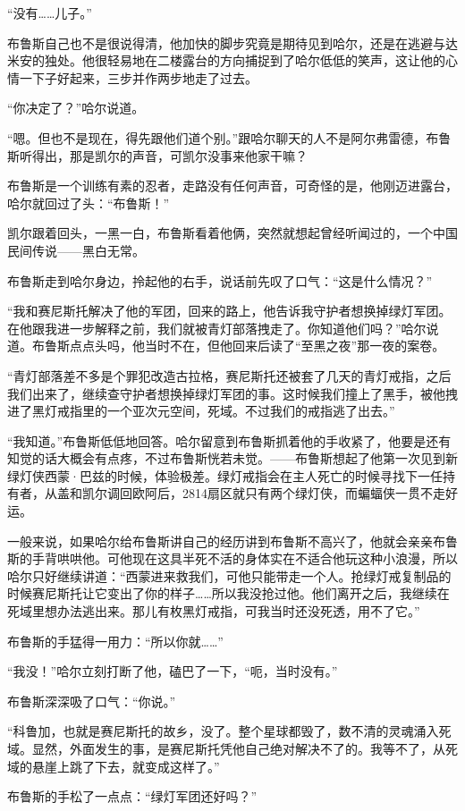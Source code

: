 \documentclass[../main]{subfiles}
\begin{document}
“没有……儿子。”

布鲁斯自己也不是很说得清，他加快的脚步究竟是期待见到哈尔，还是在逃避与达米安的独处。他很轻易地在二楼露台的方向捕捉到了哈尔低低的笑声，这让他的心情一下子好起来，三步并作两步地走了过去。

“你决定了？”哈尔说道。

“嗯。但也不是现在，得先跟他们道个别。”跟哈尔聊天的人不是阿尔弗雷德，布鲁斯听得出，那是凯尔的声音，可凯尔没事来他家干嘛？

布鲁斯是一个训练有素的忍者，走路没有任何声音，可奇怪的是，他刚迈进露台，哈尔就回过了头：“布鲁斯！”

凯尔跟着回头，一黑一白，布鲁斯看着他俩，突然就想起曾经听闻过的，一个中国民间传说——黑白无常。

布鲁斯走到哈尔身边，拎起他的右手，说话前先叹了口气：“这是什么情况？”

“我和赛尼斯托解决了他的军团，回来的路上，他告诉我守护者想换掉绿灯军团。在他跟我进一步解释之前，我们就被青灯部落拽走了。你知道他们吗？”哈尔说道。布鲁斯点点头吗，他当时不在，但他回来后读了“至黑之夜”那一夜的案卷。

“青灯部落差不多是个罪犯改造古拉格，赛尼斯托还被套了几天的青灯戒指，之后我们出来了，继续查守护者想换掉绿灯军团的事。这时候我们撞上了黑手，被他拽进了黑灯戒指里的一个亚次元空间，死域。不过我们的戒指逃了出去。”

“我知道。”布鲁斯低低地回答。哈尔留意到布鲁斯抓着他的手收紧了，他要是还有知觉的话大概会有点疼，不过布鲁斯恍若未觉。——布鲁斯想起了他第一次见到新绿灯侠西蒙·巴兹的时候，体验极差。绿灯戒指会在主人死亡的时候寻找下一任持有者，从盖和凯尔调回欧阿后，2814扇区就只有两个绿灯侠，而蝙蝠侠一贯不走好运。

一般来说，如果哈尔给布鲁斯讲自己的经历讲到布鲁斯不高兴了，他就会亲亲布鲁斯的手背哄哄他。可他现在这具半死不活的身体实在不适合他玩这种小浪漫，所以哈尔只好继续讲道：“西蒙进来救我们，可他只能带走一个人。抢绿灯戒复制品的时候赛尼斯托让它变出了你的样子……所以我没抢过他。他们离开之后，我继续在死域里想办法逃出来。那儿有枚黑灯戒指，可我当时还没死透，用不了它。”

布鲁斯的手猛得一用力：“所以你就\ldots\ldots”

“我没！”哈尔立刻打断了他，磕巴了一下，“呃，当时没有。”

布鲁斯深深吸了口气：“你说。”

“科鲁加，也就是赛尼斯托的故乡，没了。整个星球都毁了，数不清的灵魂涌入死域。显然，外面发生的事，是赛尼斯托凭他自己绝对解决不了的。我等不了，从死域的悬崖上跳了下去，就变成这样了。”

布鲁斯的手松了一点点：“绿灯军团还好吗？”
\end{document}
